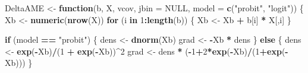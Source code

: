 \documentclass[
  12pt,
]{article}
\newenvironment{Shaded}{\begin{snugshade}}{\end{snugshade}}
\newcommand{\ControlFlowTok}[1]{\textcolor[rgb]{0.13,0.29,0.53}{\textbf{#1}}}
\newcommand{\DataTypeTok}[1]{\textcolor[rgb]{0.13,0.29,0.53}{#1}}
\newcommand{\DecValTok}[1]{\textcolor[rgb]{0.00,0.00,0.81}{#1}}
\newcommand{\KeywordTok}[1]{\textcolor[rgb]{0.13,0.29,0.53}{\textbf{#1}}}
\newcommand{\NormalTok}[1]{#1}
\newcommand{\OperatorTok}[1]{\textcolor[rgb]{0.81,0.36,0.00}{\textbf{#1}}}
\newcommand{\OtherTok}[1]{\textcolor[rgb]{0.56,0.35,0.01}{#1}}
\newcommand{\StringTok}[1]{\textcolor[rgb]{0.31,0.60,0.02}{#1}}
\begin{document}
\begin{Shaded}
\begin{Highlighting}[]
\NormalTok{DeltaAME \textless{}{-}}\StringTok{ }\ControlFlowTok{function}\NormalTok{(b, X, vcov, }\DataTypeTok{jbin =} \OtherTok{NULL}\NormalTok{, }\DataTypeTok{model =} \KeywordTok{c}\NormalTok{(}\StringTok{"probit"}\NormalTok{, }\StringTok{"logit"}\NormalTok{)) \{}
\NormalTok{  Xb \textless{}{-}}\StringTok{ }\KeywordTok{numeric}\NormalTok{(}\KeywordTok{nrow}\NormalTok{(X))}
  \ControlFlowTok{for}\NormalTok{ (i }\ControlFlowTok{in} \DecValTok{1}\OperatorTok{:}\KeywordTok{length}\NormalTok{(b)) \{}
\NormalTok{     Xb \textless{}{-}}\StringTok{ }\NormalTok{Xb }\OperatorTok{+}\StringTok{ }\NormalTok{b[i] }\OperatorTok{*}\StringTok{ }\NormalTok{X[,i]}
\NormalTok{  \}}

  \ControlFlowTok{if}\NormalTok{ (model }\OperatorTok{==}\StringTok{ "probit"}\NormalTok{) \{}
\NormalTok{    dens \textless{}{-}}\StringTok{ }\KeywordTok{dnorm}\NormalTok{(Xb)}
\NormalTok{    grad \textless{}{-}}\StringTok{ }\OperatorTok{{-}}\NormalTok{Xb }\OperatorTok{*}\StringTok{ }\NormalTok{dens}
\NormalTok{  \} }\ControlFlowTok{else}\NormalTok{ \{}
\NormalTok{    dens \textless{}{-}}\StringTok{ }\KeywordTok{exp}\NormalTok{(}\OperatorTok{{-}}\NormalTok{Xb)}\OperatorTok{/}\NormalTok{(}\DecValTok{1} \OperatorTok{+}\StringTok{ }\KeywordTok{exp}\NormalTok{(}\OperatorTok{{-}}\NormalTok{Xb))}\OperatorTok{\^{}}\DecValTok{2}
\NormalTok{    grad \textless{}{-}}\StringTok{ }\NormalTok{dens }\OperatorTok{*}\StringTok{ }\NormalTok{(}\OperatorTok{{-}}\DecValTok{1}\OperatorTok{+}\DecValTok{2}\OperatorTok{*}\KeywordTok{exp}\NormalTok{(}\OperatorTok{{-}}\NormalTok{Xb)}\OperatorTok{/}\NormalTok{(}\DecValTok{1}\OperatorTok{+}\KeywordTok{exp}\NormalTok{(}\OperatorTok{{-}}\NormalTok{Xb)))}
\NormalTok{  \}}


\end{Highlighting}
\end{Shaded}
\end{document}
